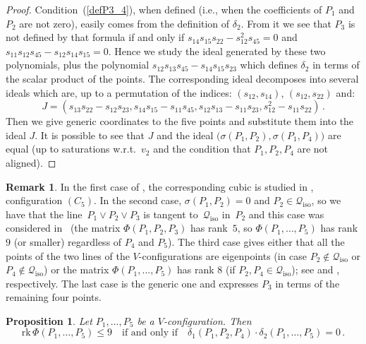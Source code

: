 \documentclass{amsart}
\theoremstyle{plain}
\newtheorem{prop}[lemma]{Proposition}
\theoremstyle{definition}
\newtheorem{rmk}[lemma]{Remark}
\newcommand{\iso}{\mathcal{Q}_{\mathrm{iso}}}
\newcommand{\rk}{\ensuremath{\mathrm{rk}}}
\begin{document}
\begin{proof}
Condition~(\ref{defP3_4}), when defined (i.e., when the coefficients of $P_1$ and~$P_2$ are not zero), easily comes from the definition of $\delta_2$.
From it we see that $P_3$ is not defined by that formula if and only if
$s_{14}s_{15}s_{22}-s_{12}^2s_{45}=0$ and $s_{11}s_{12}s_{45}-s_{12}s_{14}s_{15}=0$.
Hence we study the ideal generated by these two polynomials, plus the
polynomial $s_{12}s_{13}s_{45}-s_{14}s_{15} s_{23}$ which defines
$\delta_2$ in terms of the scalar product of the points. The corresponding
ideal decomposes into several ideals which are, up to a permutation of
the indices: $(s_{12}, s_{14})$, $(s_{12}, s_{22})$ and:
%
\[
  J = (s_{13}s_{22} - s_{12}s_{23}, s_{14}s_{15} - s_{11}s_{45}, s_{12}s_{13} -
  s_{11}s_{23}, s_{12}^2 - s_{11}s_{22}) \,.
\]
%
Then we give generic coordinates to the five
points and substitute them into the ideal $J$. It is possible to see that
$J$ and the ideal $\bigl(\sigma(P_1, P_2), \sigma(P_1, P_4)\bigr)$ are equal (up to
saturations w.r.t.\ $v_2$ and the condition that $P_1, P_2, P_4$ are not
aligned).
\end{proof}
%
\begin{rmk}
In the first case of , the corresponding cubic
is studied in , configuration $(C_5)$.
In the second case, $\sigma(P_1, P_2) = 0$ and $P_2\in \iso$, so
we have that the line~$P_1 \vee P_2 \vee P_3$ is tangent to~$\iso$ in~$P_2$
and this case was considered in~
(the matrix $\Phi(P_1, P_2, P_3)$ has rank~$5$, so
$\Phi(P_1, \dots, P_5)$ has rank $9$ (or smaller) regardless of
$P_4$ and $P_5$).
The third case gives either that all the
points of the two lines of the $V$-configurations are eigenpoints (in case
$P_2 \not\in \iso$ or $P_4 \not\in \iso$) or the matrix $\Phi(P_1, \dots, P_5)$
has rank $8$ (if $P_2, P_4 \in \iso$); see  and , respectively.
The last case is the generic one and expresses $P_3$ in terms of the remaining four points.
\end{rmk}
%
\begin{prop}
\label{prop:d1d2}
Let $P_1, \dots, P_5$ be a $V$-configuration. Then
%
\[
  \rk \,\Phi(P_1, \dots, P_5) \leq 9
  \quad \mbox{if and only if} \quad
  \delta_1(P_1, P_2, P_4) \cdot \delta_2(P_1, \dots, P_5) = 0 \,.
\]
%
\end{prop}
\end{document}
